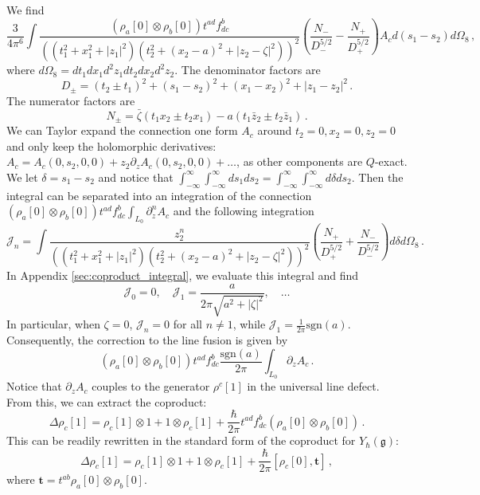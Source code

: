 \documentclass[11pt]{article}
\numberwithin{equation}{section}
\begin{document}
We find  
\begin{equation}
	\frac{3}{4\pi^6}\int
\frac{(\rho_a[0]\otimes \rho_b[0]) t^{ad}f_{dc}^b}{((t_1^2 + x_1^2 + |z_1|^2)(t_2^2 + (x_2 - a)^2 + |z_2 - \zeta|^2) )^2}\left(\frac{N_-}{D_-^{5/2}} - \frac{N_+}{D_+^{5/2}}\right)A_c d(s_1 - s_2)d\Omega_{8}\, ,
\end{equation}
where $ d\Omega_{8} = dt_1dx_1d^2z_1dt_2dx_2d^2z_2 .$
The denominator factors are
\begin{equation}
	D_\pm = (t_2\pm t_1)^2 + (s_1 - s_2)^2 + (x_1 - x_2)^2 + |z_1-z_2|^2\,.
\end{equation}
The numerator factors are
\begin{equation}
	N_{\pm}= \bar\zeta (t_1x_2 \pm t_2x_1) - a (t_1\bar z_2 \pm t_2\bar z_1)\,.
\end{equation}
 We can Taylor expand the connection one form $A_c$ around $t_2 = 0,x_2 = 0,z_2 = 0$ and only keep the holomorphic derivatives: $A_c = A_c(0,s_2,0,0) + z_2 \partial_zA_c(0,s_2,0,0)  + \dots $, as other components are $Q$-exact. We let $\delta = s_1 - s_2$ and notice that $\int_{-\infty}^{\infty}\int_{-\infty}^{\infty}ds_1ds_2 = \int_{-\infty}^{\infty}\int_{-\infty}^{\infty}d\delta ds_2 $. Then the integral can be separated into an integration of the connection $(\rho_a[0]\otimes \rho_b[0]) t^{ad}f_{dc}^b \int_{L_0}\partial_z^nA_c$ and the following integration
   \begin{equation}
	\mathcal{J}_n = \int \frac{z_2^n}{((t_1^2 + x_1^2 + |z_1|^2)(t_2^2 + (x_2 - a)^2 + |z_2 - \zeta|^2) )^2}\left(\frac{N_+}{D_+^{5/2}} + \frac{N_-}{D_-^{5/2}}\right)d\delta d\Omega_{8} \,.
\end{equation}
In Appendix \ref{sec:coproduct_integral}, we evaluate this integral and find
\begin{equation} 
\mathcal{J}_0 = 0, \quad \mathcal{J}_1 = \frac{a}{2\pi \sqrt{a^2+|\zeta|^2}} ,\quad \dots 
\end{equation}
In particular, when $\zeta = 0$, $\mathcal{J}_n = 0$ for all $n \neq 1$, while $\mathcal{J}_1 = \frac{1}{2\pi}\mathrm{sgn}(a)$. Consequently, the correction to the line fusion is given by
\begin{equation}
	(\rho_a[0]\otimes \rho_b[0]) t^{ad}f_{dc}^b \frac{\mathrm{sgn}(a)}{2\pi} \int_{L_0} \partial_z A_c \,.
\end{equation}
Notice that $\partial_z A_c$ couples to the generator $\rho^c[1]$ in the universal line defect. From this, we can extract the coproduct:
\begin{equation}
	\Delta \rho_c[1] = \rho_c[1]\otimes 1 + 1\otimes \rho_c[1] +  \frac{\hbar}{2\pi} t^{ad}f_{dc}^b  (\rho_a[0]\otimes \rho_b[0]) \,.
\end{equation}
This can be readily rewritten in the standard form of the coproduct for $Y_{\hbar}(\mathfrak{g})$:
\begin{equation}
	\Delta \rho_c[1] = \rho_c[1]\otimes 1 + 1\otimes \rho_c[1] +  \frac{\hbar}{2\pi} [\rho_c[0],\mathbf{t}] \,,
\end{equation}
where $\mathbf{t} = t^{ab}\rho_a[0]\otimes \rho_b[0]$.
\end{document}
